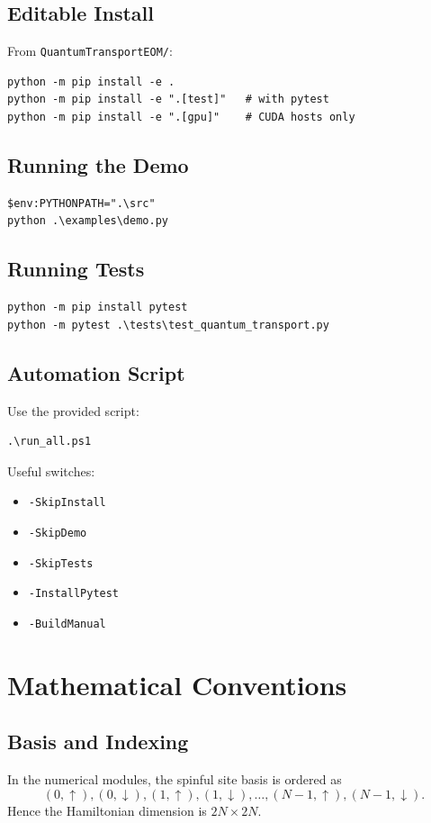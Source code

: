 \documentclass[11pt,a4paper]{article}
\begin{document}
\subsection{Editable Install}
From \texttt{QuantumTransportEOM/}:
\begin{lstlisting}[style=ps]
python -m pip install -e .
python -m pip install -e ".[test]"   # with pytest
python -m pip install -e ".[gpu]"    # CUDA hosts only
\end{lstlisting}

\subsection{Running the Demo}
\begin{lstlisting}[style=ps]
$env:PYTHONPATH=".\src"
python .\examples\demo.py
\end{lstlisting}

\subsection{Running Tests}
\begin{lstlisting}[style=ps]
python -m pip install pytest
python -m pytest .\tests\test_quantum_transport.py
\end{lstlisting}

\subsection{Automation Script}
Use the provided script:
\begin{lstlisting}[style=ps]
.\run_all.ps1
\end{lstlisting}

Useful switches:
\begin{itemize}[leftmargin=1.5em]
  \item \texttt{-SkipInstall}
  \item \texttt{-SkipDemo}
  \item \texttt{-SkipTests}
  \item \texttt{-InstallPytest}
  \item \texttt{-BuildManual}
\end{itemize}

\section{Mathematical Conventions}
\subsection{Basis and Indexing}
In the numerical modules, the spinful site basis is ordered as
\[
(0,\uparrow),(0,\downarrow),(1,\uparrow),(1,\downarrow),\dots,(N-1,\uparrow),(N-1,\downarrow).
\]
Hence the Hamiltonian dimension is \(2N \times 2N\).
\end{document}
